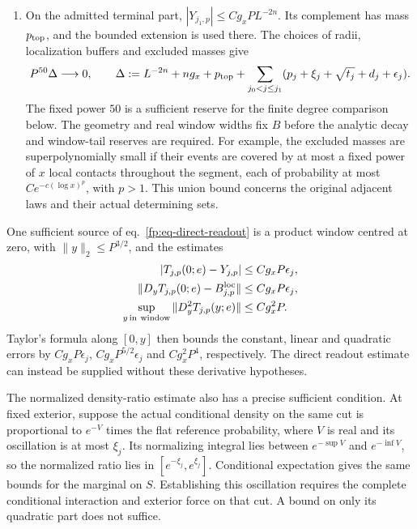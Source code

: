 \documentclass[11pt,letterpaper,reqno]{amsart}
\numberwithin{equation}{section}
\renewcommand{\eqref}[1]{\textup{eq.~\ref{#1}}}
\theoremstyle{definition}
\theoremstyle{remark}
\begin{document}
\begin{enumerate}
\item On the admitted terminal part,
\(|Y_{j_1,p}|\le Cg_xP L^{-2n}\). Its complement has mass
\(p_{\rm top}\), and the bounded extension is used there.
The choices of radii, localization buffers and excluded masses give
\begin{equation}\label{fp:eq-clean-smallness}
 P^{50}\Delta\longrightarrow0,\qquad
 \Delta:=L^{-2n}+n g_x+p_{\rm top}+
       \sum_{j_0<j\le j_1}
        (p_j+\xi_j+\sqrt{t_j}+d_j+\epsilon_j).
\end{equation}
The fixed power $50$ is a sufficient reserve for the finite
degree comparison below. The geometry and real window widths
fix $B$ before the analytic decay and window-tail reserves are
required. For example, the excluded masses are
superpolynomially small if their events are covered by at most
a fixed power of \(x\) local contacts throughout the segment,
each of probability at most \(Ce^{-c(\log x)^p}\), with \(p>1\).
This union bound concerns the original adjacent laws and their
actual determining sets.
\end{enumerate}

One sufficient source of \eqref{fp:eq-direct-readout} is a
product window centred at zero, with \(\|y\|_2\le P^{3/2}\),
and the estimates
\[
 \begin{split}
 |T_{j,p}(0;e)-Y_{j,p}|&\le Cg_xP\epsilon_j,\\
 \|D_yT_{j,p}(0;e)-B^{\rm loc}_{j,p}\|&\le Cg_xP\epsilon_j,\\
 \sup_{y\,\mathrm{in\ window}}\|D_y^2T_{j,p}(y;e)\|
     &\le Cg_x^2P.
 \end{split}
\]
Taylor's formula along \([0,y]\) then bounds the constant,
linear and quadratic errors by
\(Cg_xP\epsilon_j\), \(Cg_xP^{5/2}\epsilon_j\) and
\(Cg_x^2P^4\), respectively. The direct readout estimate
can instead be supplied without these derivative hypotheses.

The normalized density-ratio estimate also has a precise
sufficient condition. At fixed exterior, suppose the actual
conditional density on the same cut is proportional to
\(e^{-V}\) times the flat reference probability, where \(V\)
is real and its oscillation is at most \(\xi_j\).
Its normalizing integral lies between
\(e^{-\sup V}\) and \(e^{-\inf V}\), so the normalized
ratio lies in \([e^{-\xi_j},e^{\xi_j}]\).
Conditional expectation gives the same bounds for the marginal
on \(S\). Establishing this oscillation requires the complete
conditional interaction and exterior force on that cut.
A bound on only its quadratic part does not suffice.
\end{document}
